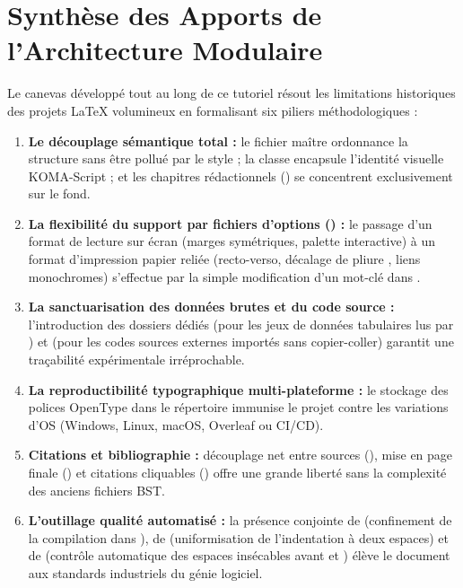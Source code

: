 \section{Synthèse des Apports de l'Architecture Modulaire}
\label{sec:conclusion-synthese}

Le canevas développé tout au long de ce tutoriel résout les limitations historiques
des projets \LaTeX{} volumineux en formalisant six piliers méthodologiques :

\begin{enumerate}
  \item \textbf{Le découplage sémantique total :}
  le fichier maître  ordonnance la structure sans être pollué par le style ;
  la classe  encapsule l'identité visuelle KOMA-Script ;
  et les chapitres rédactionnels () se concentrent exclusivement sur le fond.
  \item \textbf{La flexibilité du support par fichiers d'options () :}
  le passage d'un format de lecture sur écran (marges symétriques, palette interactive)
  à un format d'impression papier reliée (recto-verso, décalage de pliure , liens monochromes)
  s'effectue par la simple modification d'un mot-clé dans .
  \item \textbf{La sanctuarisation des données brutes et du code source :}
  l'introduction des dossiers dédiés  (pour les jeux de données tabulaires  lus par )
  et  (pour les codes sources externes importés sans copier-coller)
  garantit une traçabilité expérimentale irréprochable.
  \item \textbf{La reproductibilité typographique multi-plateforme :}
  le stockage des polices OpenType dans le répertoire 
  immunise le projet contre les variations d'OS (Windows, Linux, macOS, Overleaf ou CI/CD).
  \item \textbf{Citations et bibliographie :}
  découplage net entre sources (),
  mise en page finale ()
  et citations cliquables ()
  offre une grande liberté sans la complexité des anciens fichiers BST.
  \item \textbf{L'outillage qualité automatisé :}
  la présence conjointe de  (confinement de la compilation dans ),
  de  (uniformisation de l'indentation à deux espaces)
  et de  (contrôle automatique des espaces insécables avant  et )
  élève le document aux standards industriels du génie logiciel.
\end{enumerate}

